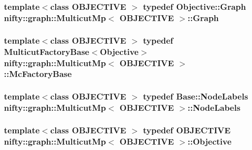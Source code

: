 \subsubsection[{Graph}]{\setlength{\rightskip}{0pt plus 5cm}template$<$class O\+B\+J\+E\+C\+T\+I\+V\+E $>$ typedef Objective\+::\+Graph {\bf nifty\+::graph\+::\+Multicut\+Mp}$<$ O\+B\+J\+E\+C\+T\+I\+V\+E $>$\+::{\bf Graph}}\label{classnifty_1_1graph_1_1MulticutMp_a8e58eea9eaf877b4968c9a0a0eafea78}
\hypertarget{classnifty_1_1graph_1_1MulticutMp_a6da7773d133f8c60d195bf6bc42dddcd}{}
\subsubsection[{Mc\+Factory\+Base}]{\setlength{\rightskip}{0pt plus 5cm}template$<$class O\+B\+J\+E\+C\+T\+I\+V\+E $>$ typedef {\bf Multicut\+Factory\+Base}$<${\bf Objective}$>$ {\bf nifty\+::graph\+::\+Multicut\+Mp}$<$ O\+B\+J\+E\+C\+T\+I\+V\+E $>$\+::{\bf Mc\+Factory\+Base}}\label{classnifty_1_1graph_1_1MulticutMp_a6da7773d133f8c60d195bf6bc42dddcd}
\hypertarget{classnifty_1_1graph_1_1MulticutMp_ac6eb2553f7db7fd34c2c3a7c182c695d}{}
\subsubsection[{Node\+Labels}]{\setlength{\rightskip}{0pt plus 5cm}template$<$class O\+B\+J\+E\+C\+T\+I\+V\+E $>$ typedef {\bf Base\+::\+Node\+Labels} {\bf nifty\+::graph\+::\+Multicut\+Mp}$<$ O\+B\+J\+E\+C\+T\+I\+V\+E $>$\+::{\bf Node\+Labels}}\label{classnifty_1_1graph_1_1MulticutMp_ac6eb2553f7db7fd34c2c3a7c182c695d}
\hypertarget{classnifty_1_1graph_1_1MulticutMp_a5dbc4d81a00cd2ad98b4d28bc64f8ea8}{}
\subsubsection[{Objective}]{\setlength{\rightskip}{0pt plus 5cm}template$<$class O\+B\+J\+E\+C\+T\+I\+V\+E $>$ typedef O\+B\+J\+E\+C\+T\+I\+V\+E {\bf nifty\+::graph\+::\+Multicut\+Mp}$<$ O\+B\+J\+E\+C\+T\+I\+V\+E $>$\+::{\bf Objective}}\label{classnifty_1_1graph_1_1MulticutMp_a5dbc4d81a00cd2ad98b4d28bc64f8ea8}
\hypertarget{classnifty_1_1graph_1_1MulticutMp_a475f0ecbf40dffd9cdad45867068edf4}{}
